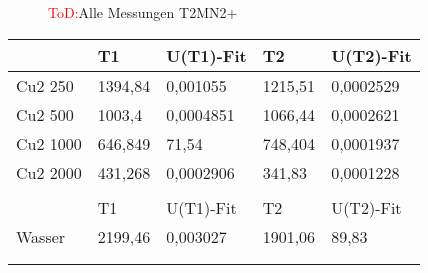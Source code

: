 \begin{figure}[H]
    \centering
    
    \caption{\textcolor{red}{ToD:}Alle Messungen T2MN2+}
    \label{fig:T2M}
\end{figure}

\begin{table}[H]
    	\centering
        \begin{tabular}{lllll}  \hline
        \multicolumn{1}{|l|}{}            & \multicolumn{1}{l|}{T1}      & \multicolumn{1}{l|}{U(T1)-Fit} & \multicolumn{1}{l|}{T2}      & \multicolumn{1}{l|}{U(T2)-Fit}  \\ \hline
        \multicolumn{1}{|l|}{Cu2    250}  & \multicolumn{1}{l|}{1394,84} & \multicolumn{1}{l|}{0,001055}  & \multicolumn{1}{l|}{1215,51} & \multicolumn{1}{l|}{0,0002529}  \\ \hline
        \multicolumn{1}{|l|}{Cu2    500}  & \multicolumn{1}{l|}{1003,4}  & \multicolumn{1}{l|}{0,0004851} & \multicolumn{1}{l|}{1066,44} & \multicolumn{1}{l|}{0,0002621}  \\ \hline
        \multicolumn{1}{|l|}{Cu2    1000} & \multicolumn{1}{l|}{646,849} & \multicolumn{1}{l|}{71,54}     & \multicolumn{1}{l|}{748,404} & \multicolumn{1}{l|}{0,0001937}  \\ \hline
        \multicolumn{1}{|l|}{Cu2    2000} & \multicolumn{1}{l|}{431,268} & \multicolumn{1}{l|}{0,0002906} & \multicolumn{1}{l|}{341,83}  & \multicolumn{1}{l|}{0,0001228}  \\ \hline
                                        &                              &                                &                              &                                 \\ \hline
        \multicolumn{1}{|l|}{}            & \multicolumn{1}{l|}{T1}      & \multicolumn{1}{l|}{U(T1)-Fit} & \multicolumn{1}{l|}{T2}      & \multicolumn{1}{l|}{U(T2)-Fit}  \\ \hline
        \multicolumn{1}{|l|}{Wasser}      & \multicolumn{1}{l|}{2199,46} & \multicolumn{1}{l|}{0,003027}  & \multicolumn{1}{l|}{1901,06} & \multicolumn{1}{l|}{89,83}      \\ \hline
                                        &                              &                                &                              &                                 \\
                                        &                              &                                &                              &                                 \\ \hline

\end{tabular}
\end{table}

